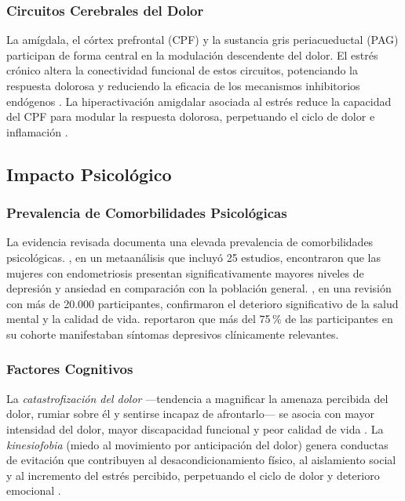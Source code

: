 \documentclass[12pt, a4paper]{article}
\begin{document}
\subsubsection{Circuitos Cerebrales del Dolor}

La amígdala, el córtex prefrontal (CPF) y la sustancia gris periacueductal (PAG) participan de
forma central en la modulación descendente del dolor. El estrés crónico altera la conectividad
funcional de estos circuitos, potenciando la respuesta dolorosa y reduciendo la eficacia de los
mecanismos inhibitorios endógenos \parencite{Tracey2021, Zhang2019}. La hiperactivación
amigdalar asociada al estrés reduce la capacidad del CPF para modular la respuesta dolorosa,
perpetuando el ciclo de dolor e inflamación \parencite{Apkarian2021}.

\subsection{Impacto Psicológico}

\subsubsection{Prevalencia de Comorbilidades Psicológicas}

La evidencia revisada documenta una elevada prevalencia de comorbilidades psicológicas.
\textcite{VanBarneveld2021}, en un metaanálisis que incluyó 25 estudios, encontraron que las
mujeres con endometriosis presentan significativamente mayores niveles de depresión y ansiedad
en comparación con la población general. \textcite{Wang2021}, en una revisión con más de
20.000 participantes, confirmaron el deterioro significativo de la salud mental y la calidad de
vida. \textcite{Warzecha2020} reportaron que más del 75\,\% de las participantes en su cohorte
manifestaban síntomas depresivos clínicamente relevantes.

\subsubsection{Factores Cognitivos}

La \textit{catastrofización del dolor} —tendencia a magnificar la amenaza percibida del dolor,
rumiar sobre él y sentirse incapaz de afrontarlo— se asocia con mayor intensidad del dolor,
mayor discapacidad funcional y peor calidad de vida \parencite{Aerts2018}. La
\textit{kinesiofobia} (miedo al movimiento por anticipación del dolor) genera conductas de
evitación que contribuyen al desacondicionamiento físico, al aislamiento social y al incremento
del estrés percibido, perpetuando el ciclo de dolor y deterioro emocional \parencite{Aerts2018}.
\end{document}
